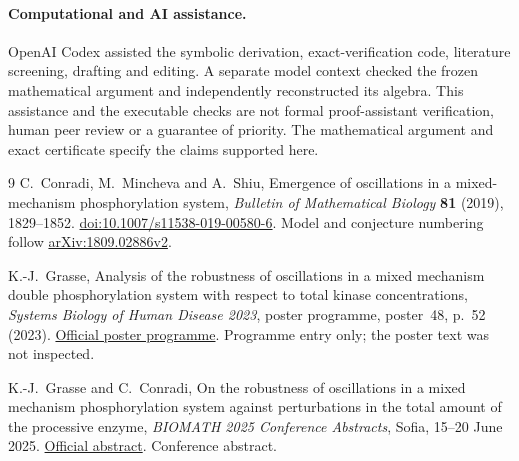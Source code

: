 \documentclass[11pt]{article}
\begin{document}
\paragraph{Computational and AI assistance.}
OpenAI Codex assisted the symbolic derivation, exact-verification code,
literature screening, drafting and editing. A separate model context checked
the frozen mathematical argument and independently reconstructed its algebra.
This assistance and the executable checks are not formal proof-assistant
verification, human peer review or a guarantee of priority. The mathematical
argument and exact certificate specify the claims supported here.

\begin{thebibliography}{9}
C.~Conradi, M.~Mincheva and A.~Shiu,
Emergence of oscillations in a mixed-mechanism phosphorylation system,
\emph{Bulletin of Mathematical Biology} \textbf{81} (2019), 1829--1852.
\href{https://doi.org/10.1007/s11538-019-00580-6}{doi:10.1007/s11538-019-00580-6}.
Model and conjecture numbering follow
\href{https://arxiv.org/abs/1809.02886v2}{arXiv:1809.02886v2}.

K.-J.~Grasse,
Analysis of the robustness of oscillations in a mixed mechanism double
phosphorylation system with respect to total kinase concentrations,
\emph{Systems Biology of Human Disease 2023}, poster programme,
poster~48, p.~52 (2023).
\href{https://www.sbhdberlin.org/pdf/SBHD2023_Poster_Session_Program.pdf}{Official poster programme}.
Programme entry only; the poster text was not inspected.

K.-J.~Grasse and C.~Conradi,
On the robustness of oscillations in a mixed mechanism phosphorylation system
against perturbations in the total amount of the processive enzyme,
\emph{BIOMATH 2025 Conference Abstracts}, Sofia, 15--20 June 2025.
\href{https://biomath.math.bas.bg/biomath/index.php/bmcs/article/download/1787/1594/7828}{Official abstract}.
Conference abstract.
\end{thebibliography}
\end{document}
